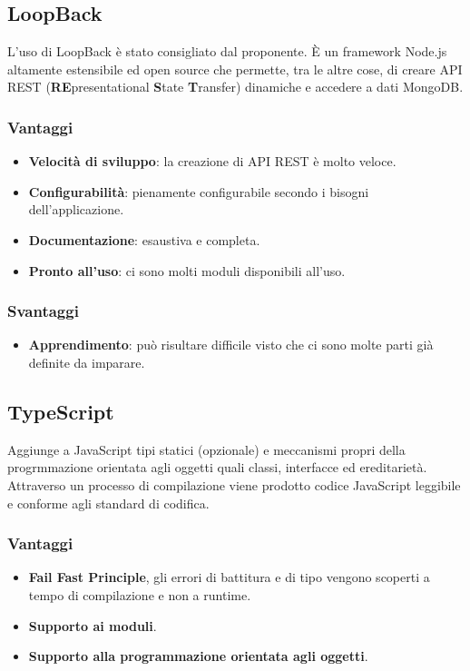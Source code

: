 \subsection{LoopBack}
L'uso di LoopBack \`e stato consigliato dal proponente. \`E un framework Node.js altamente estensibile ed open source che permette, tra le altre cose, di creare API REST (\textbf{RE}presentational \textbf{S}tate \textbf{T}ransfer) dinamiche e accedere a dati MongoDB.
\subsubsection{Vantaggi}
\begin{itemize}
\item \textbf{Velocit\`a di sviluppo}: la creazione di API REST \`e molto veloce.
\item \textbf{Configurabilit\`a}: pienamente configurabile secondo i bisogni dell'applicazione.
\item \textbf{Documentazione}: esaustiva e completa.
\item \textbf{Pronto all'uso}: ci sono molti moduli disponibili all'uso.
\end{itemize}
\subsubsection{Svantaggi}
\begin{itemize}
\item \textbf{Apprendimento}: pu\`o risultare difficile visto che ci sono molte parti gi\`a definite da imparare.
\end{itemize}
\subsection{TypeScript}
Aggiunge a JavaScript tipi statici (opzionale) e meccanismi propri della progrmmazione orientata agli oggetti quali classi, interfacce ed ereditariet\`a. Attraverso un processo di compilazione viene prodotto codice JavaScript leggibile e conforme agli standard di codifica. 
\subsubsection{Vantaggi}
\begin{itemize}
\item \textbf{Fail Fast Principle}, gli errori di battitura e di tipo vengono scoperti a tempo di compilazione e non a runtime.
\item \textbf{Supporto ai moduli}.
\item \textbf{Supporto alla programmazione orientata agli oggetti}.
\end{itemize}
